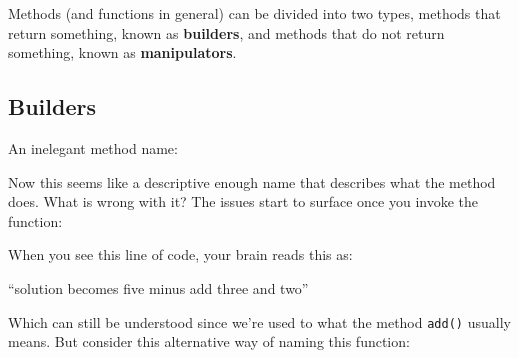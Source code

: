 Methods (and functions in general) can be divided into two types,
methods that return something, known as \textbf{builders}, and methods
that do not return something, known as \textbf{manipulators}.

\subsection{Builders}\label{extra-stuff.md__builders}

An inelegant method name:

\begin{Shaded}
\begin{Highlighting}[]
\NormalTok{) }\OperatorTok{{-}\textgreater{}} \NormalTok{:}
    \OperatorTok{+}
\end{Highlighting}
\end{Shaded}

Now this seems like a descriptive enough name that describes what the
method does. What is wrong with it? The issues start to surface once you
invoke the function:

\begin{Shaded}
\begin{Highlighting}[]
\OperatorTok{=}  \OperatorTok{{-}}\NormalTok{,}\NormalTok{)}
\end{Highlighting}
\end{Shaded}

When you see this line of code, your brain reads this as:

``solution becomes five minus add three and two''

Which can still be understood since we're used to what the method
\texttt{add()} usually means. But consider this alternative way of
naming this function:

\begin{Shaded}
\begin{Highlighting}[]
 \NormalTok{) }\OperatorTok{{-}\textgreater{}} \NormalTok{:}
    \OperatorTok{+}
\end{Highlighting}
\end{Shaded}

